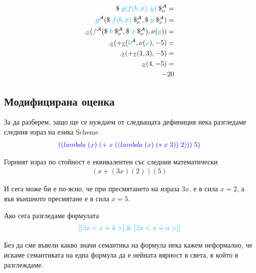 \documentclass{article}[12pt]
\begin{document}
\begin{align*}
\$ \; \color{cyan}g(f(b, x), y) \color{black} \; \$^{\mathcal{A}}_\nu = \\
\color{cyan} g \color{black} ^{\mathcal{A}}(\$ \; \color{cyan} f(b, x) \color{black} \; \$^{\mathcal{A}}_\nu, \$ \; \color{cyan} y \color{black} \; \$^{\mathcal{A}}_\nu ) = \\
._\mathbb{Z}(\color{cyan} f \color{black} ^{\mathcal{A}}(\$ \; \color{cyan} b \color{black} \; \$^{\mathcal{A}}_\nu, \$ \; \color{cyan} x \color{black} \; \$^{\mathcal{A}}_\nu ), \nu(\color{cyan} y \color{black})) = \\
._\mathbb{Z}(+_\mathbb{Z}(\color{cyan} b \color{black} ^{\mathcal{A}} , \nu(\color{cyan} x \color{black}), -5) = \\
._\mathbb{Z}(+_\mathbb{Z}(1,  3) , -5) =  \\
._\mathbb{Z}(4, -5) = \\
-20
\end{align*}

\subsection{Модифицирана оценка}

За да разберем, защо ще се нуждаем от следващата дефиниция
нека разгледаме следния израз на езика Scheme
\begin{align*}
\color{blue}
((lambda \; (x) \; (+ \; x \; ((lambda \; (x) \; (* \; x \; 3)) \; 2))) \; 5)
\end{align*}

Горният израз по стойност е еквивалентен със следния математически
\begin{align*}
(x + (3x)(2))(5)
\end{align*}

И сега може би е по-ясно, че при пресмятането на израза \(3x\),
е в сила \(x = 2\), а във външното пресмятане е в сила \(x = 5\). 

\vspace{0.5cm}

Ако сега разгледаме формулата
\begin{align*}
\color{cyan}
[[\exists x <x \doteq b>] \; \& \; [\exists x <x \doteq a>]]
\end{align*}

Без да сме въвели какво значи семантика на формула нека кажем неформално,
че искаме семантиката на една формула да е нейната вярност в света, в който я разглеждаме.

\vspace{0.5cm}
\end{document}
